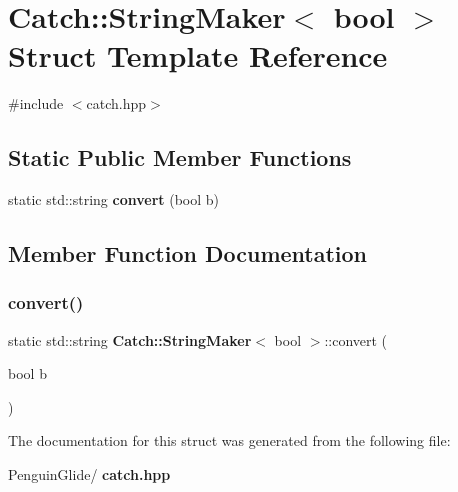 \section{Catch\+::String\+Maker$<$ bool $>$ Struct Template Reference}
\label{struct_catch_1_1_string_maker_3_01bool_01_4}


{\ttfamily \#include $<$catch.\+hpp$>$}

\subsection*{Static Public Member Functions}
\begin{DoxyCompactItemize}
\item 
static std\+::string \textbf{ convert} (bool b)
\end{DoxyCompactItemize}


\subsection{Member Function Documentation}
\mbox{\label{struct_catch_1_1_string_maker_3_01bool_01_4_a37e9899c82c4b4515f876f16f8957a77}} 
\subsubsection{convert()}
{\footnotesize\ttfamily static std\+::string \textbf{ Catch\+::\+String\+Maker}$<$ bool $>$\+::convert (\begin{DoxyParamCaption}\item[{bool}]{b }\end{DoxyParamCaption})\hspace{0.3cm}{\ttfamily [static]}}



The documentation for this struct was generated from the following file\+:\begin{DoxyCompactItemize}
\item 
Penguin\+Glide/\textbf{ catch.\+hpp}\end{DoxyCompactItemize}
